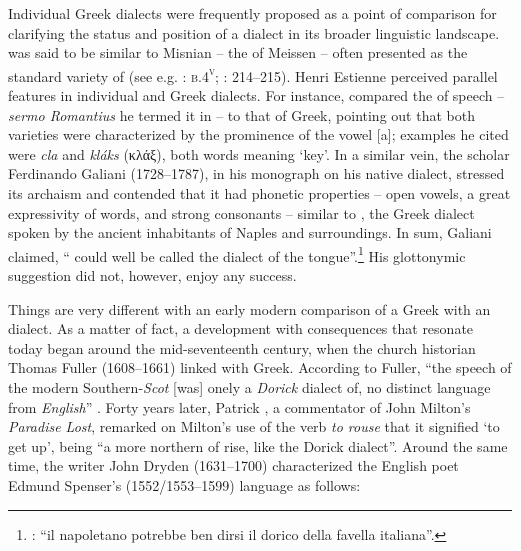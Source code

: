 Individual Greek dialects were frequently proposed as a point of comparison for clarifying the status and position of a  dialect in its broader linguistic landscape.  was said to be similar to Misnian – the  of Meissen – often presented as the standard variety of  (see e.g. \citealt{Borner1705}: \textsc{b.4}\textsc{\textsuperscript{v}}; \citealt{Simonis1752}: 214–215). Henri Estienne perceived parallel features in individual  and Greek dialects. For instance, \citet[3--4]{Estienne1582} compared the  of  speech – \textit{sermo Romantius} he termed it in  – to that of  Greek, pointing out that both varieties were characterized by the prominence of the vowel [a]; examples he cited were  \textit{cla} and  \textit{kláks} (κλάξ), both words meaning ‘key’. In a similar vein, the  scholar Ferdinando Galiani (1728–1787), in his monograph on his native  dialect, stressed its archaism and contended that it had phonetic properties – open vowels, a great expressivity of words, and strong consonants – similar to , the Greek dialect spoken by the ancient inhabitants of Naples and surroundings. In sum, Galiani claimed, “ could well be called the  dialect of the  tongue”.\footnote{\citet[16]{Galiani1779}: “il napoletano potrebbe ben dirsi il dorico della favella italiana”.} His glottonymic suggestion did not, however, enjoy any success.

Things are very different with an early modern comparison of a Greek with an  dialect. As a matter of fact, a development with consequences that resonate today began around the mid-seventeenth century, when the church historian Thomas Fuller (1608–1661) linked  with  Greek. According to Fuller, “the speech of the modern Southern-\textit{Scot} [was] onely a \textit{Dorick} dialect of, no distinct language from \textit{English}” \citep[81]{Fuller1655}. Forty years later, Patrick \citet[20]{Hume1695}, a commentator of John Milton’s \textit{Paradise Lost}, remarked on Milton’s use of the verb \textit{to rouse} that it signified ‘to get up’, being “a more northern  of rise, like the Dorick dialect”. Around the same time, the writer John Dryden (1631–1700) characterized the English poet Edmund Spenser’s (1552/1553–1599) language as follows:

